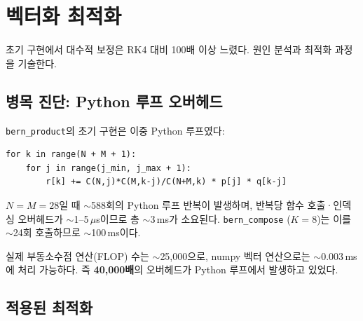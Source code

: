 \documentclass[11pt]{article}
\begin{document}
\section{벡터화 최적화}
\label{sec:vectorization}

초기 구현에서 대수적 보정은 RK4 대비 100배 이상 느렸다.
원인 분석과 최적화 과정을 기술한다.

\subsection{병목 진단: Python 루프 오버헤드}

\texttt{bern\_product}의 초기 구현은 이중 Python 루프였다:
\begin{lstlisting}[style=pythonstyle]
for k in range(N + M + 1):
    for j in range(j_min, j_max + 1):
        r[k] += C(N,j)*C(M,k-j)/C(N+M,k) * p[j] * q[k-j]
\end{lstlisting}
$N = M = 28$일 때 $\sim$588회의 Python 루프 반복이 발생하며,
반복당 함수 호출·인덱싱 오버헤드가 $\sim$1--5\,$\mu$s이므로
총 $\sim$3\,ms가 소요된다.
\texttt{bern\_compose} ($K=8$)는 이를 $\sim$24회 호출하므로 $\sim$100\,ms이다.

실제 부동소수점 연산(FLOP) 수는 $\sim$25,000으로, numpy 벡터 연산으로는
$\sim$0.003\,ms에 처리 가능하다.
즉 \textbf{40,000배}의 오버헤드가 Python 루프에서 발생하고 있었다.

\subsection{적용된 최적화}
\end{document}
